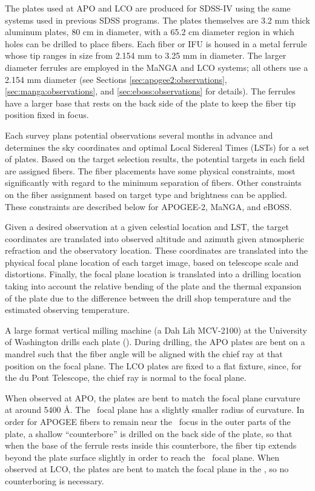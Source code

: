 The plates used at APO and LCO are produced for SDSS-IV using the same
systems used in previous SDSS programs.  The plates themselves are 3.2
mm thick aluminum plates, 80 cm in diameter, with a 65.2 cm diameter
region in which holes can be drilled to place fibers. Each fiber or
IFU is housed in a metal ferrule whose tip ranges in size from 2.154
mm to 3.25 mm in diameter. The larger diameter ferrules are employed
in the MaNGA and LCO systems; all others use a 2.154 mm diameter (see
Sections \ref{sec:apogee2:observations}, \ref{sec:manga:observations},
and \ref{sec:eboss:observations} for details). The ferrules have a
larger base that rests on the back side of the plate to keep the fiber
tip position fixed in focus.

Each survey plans potential observations several months in advance and
determines the sky coordinates and optimal Local Sidereal Times (LSTs)
for a set of plates. Based on the target selection results, the
potential targets in each field are assigned fibers. The fiber
placements have some physical constraints, most significantly with
regard to the minimum separation of fibers. Other constraints on the
fiber assignment based on target type and brightness can be applied.
These constraints are described below for APOGEE-2, MaNGA, and eBOSS.

Given a desired observation at a given celestial location and LST, the
target coordinates are translated into observed altitude and azimuth
given atmospheric refraction and the observatory location.  These
coordinates are translated into the physical focal plane location of
each target image, based on telescope scale and distortions. Finally,
the focal plane location is translated into a drilling location taking
into account the relative bending of the plate and the thermal
expansion of the plate due to the difference between the drill shop
temperature and the estimated observing temperature.

A large format vertical milling machine (a Dah Lih MCV-2100) at the
University of Washington drills each plate
(\citealt{siegmund98a}). During drilling, the APO plates are bent on a
mandrel such that the fiber angle will be aligned with the chief ray
at that position on the focal plane. The LCO plates are fixed to a
flat fixture, since, for the du Pont Telescope, the chief ray is
normal to the focal plane.

When observed at APO, the plates are bent to match the focal plane
curvature at around 5400 \AA. The \Hband\ focal plane has a slightly
smaller radius of curvature. In order for APOGEE fibers to remain near
the \Hband\ focus in the outer parts of the plate, a shallow
``counterbore'' is drilled on the back side of the plate, so that when
the base of the ferrule rests inside this counterbore, the fiber tip
extends beyond the plate surface slightly in order to reach the
\Hband\ focal plane.  When observed at LCO, the plates are bent to
match the focal plane in the \Hband, so no counterboring is
necessary.

